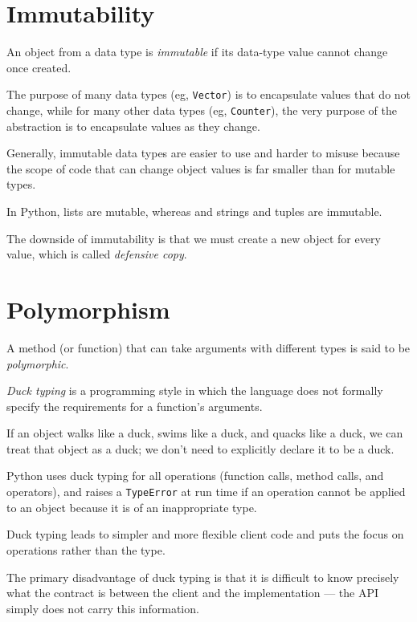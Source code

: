 \documentclass[8pt,a4paper,compress,handout]{beamer}
\begin{document}
\section{Immutability}
\begin{frame}[fragile]
An object from a data type is \emph{immutable} if its data-type value cannot change once created. 

\bigskip

The purpose of many data types (eg, \lstinline{Vector}) is to encapsulate values that do not change, while for many other data types (eg, \lstinline{Counter}), the very purpose of the abstraction is to encapsulate values as they change. 

\bigskip

Generally, immutable data types are easier to use and harder to misuse because the scope of code that can change object values is far smaller than for mutable types.

\bigskip

In Python, lists are mutable, whereas and strings and tuples are immutable.

\bigskip

The downside of immutability is that we must create a new object for every value, which is called \emph{defensive copy}.
\end{frame}

\section{Polymorphism}
\begin{frame}[fragile]
A method (or function) that can take arguments with different types is said to be \emph{polymorphic}.

\bigskip

\emph{Duck typing} is a programming style in which the language does not formally specify the requirements for a function's arguments. 

\bigskip

If an object walks like a duck, swims like a duck, and quacks like a duck, we can treat that object as a duck; we don't need to explicitly declare it to be a duck. 

\bigskip

Python uses duck typing for all operations (function calls, method calls, and operators), and raises a \lstinline{TypeError} at run time if an operation cannot be applied to an object because it is of an inappropriate type. 

\bigskip

Duck typing leads to simpler and more flexible client code and puts the focus on operations rather than the type.

\bigskip

The primary disadvantage of duck typing is that it is difficult to know precisely what the contract is between the client and the implementation --- the API simply does not carry this information.
\end{frame}
\end{document}
